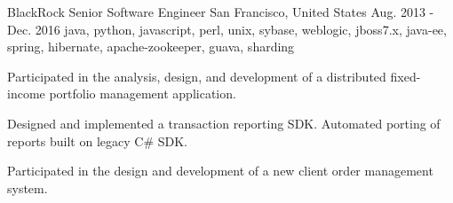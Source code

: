 \cventry
    {BlackRock} %
    {Senior Software Engineer} %
    {San Francisco, United States} %
    {Aug. 2013 - Dec. 2016} %
    {java, python, javascript, perl, unix, sybase, weblogic, jboss7.x, java-ee, spring, hibernate, apache-zookeeper, guava, sharding}%
    {
    \begin{cvitems} %
        \item { Participated in the analysis, design, and development of a distributed fixed-income portfolio management application. }
        \item { Designed and implemented a transaction reporting SDK. Automated porting of reports built on legacy C\# SDK. }
        \item { Participated in the design and development of a new client order management system. }
    \end{cvitems}
    }